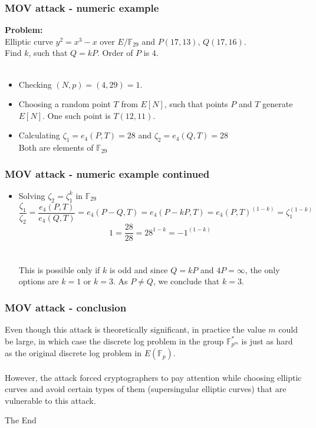 \documentclass{beamer}
\begin{document}
\begin{frame}
\frametitle{MOV attack - numeric example}
\textbf{Problem:} \\
Elliptic curve $y^2 = x^3 - x$ over $E/\mathbb{F}_{29}$ and $P(17, 13)$, $Q(17, 16)$. \\
Find $k$, such that $Q=kP$. Order of $P$ is $4$. \\ ~ \\ 

\begin{itemize}
\item Checking $(N,p) = (4, 29) = 1$. \pause \checkmark \pause
\item Choosing a random point $T$ from $E[N]$, such that points $P$ and $T$ generate $E[N]$. One such point is $T(12, 11)$.  \pause
\item Calculating $\zeta_1 = e_4(P,T) = 28$ and $\zeta_2 = e_4(Q,T) = 28$ \\
 Both are elements of $\mathbb{F}_{29}$ 
 \end{itemize}
 \end{frame}

\begin{frame}
\frametitle{MOV attack - numeric example continued}
\begin{itemize}

\item Solving $\zeta_2 = \zeta_1^k$ in $\mathbb{F}_{29}$  \\ 
$$ \frac{\zeta_1}{\zeta_2} = \frac{e_4(P,T)}{e_4(Q,T)} = e_4(P-Q,T) = e_4(P-kP, T) = e_4(P,T)^{(1-k)} = \zeta_1^(1-k)$$
$$ 1 = \frac{28}{28} = 28^{1-k} = -1^{(1-k)}$$ \\ ~ \\ \pause
This is possible only if $k$ is odd and since $Q=kP$ and $4P = \infty$, the only options are $k= 1$ or $k=3$. As $P\neq Q$, we conclude that $k = 3$.

\end{itemize}
\end{frame}

\begin{frame}
\frametitle{MOV attack - conclusion}

Even though this attack is theoretically significant, in practice the value $m$ could be large, in which case the discrete log problem in the group $\mathbb{F}^\ast_{p^m}$ is just as hard as the original discrete log problem in $E(\mathbb{F}_p)$. \\ ~ \\ \pause
However, the attack forced cryptographers to pay attention while choosing elliptic curves and avoid certain types of them (supersingular elliptic curves) that are vulnerable to this attack.
\end{frame}

\begin{frame}
\Huge{\centerline{The End}}
\end{frame}

\end{document}
